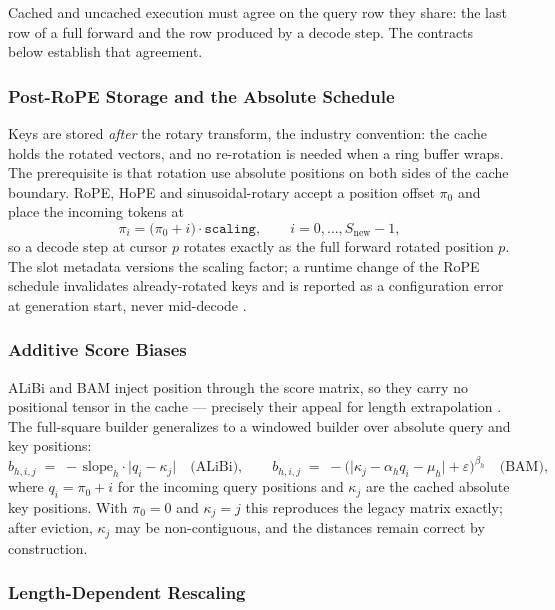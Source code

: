 Cached and uncached execution must agree on the query row they share: the last row of a full forward and the row produced by a decode step. The contracts below establish that agreement.

\subsubsection{Post-RoPE Storage and the Absolute Schedule}

Keys are stored \emph{after} the rotary transform, the industry convention: the cache holds the rotated vectors, and no re-rotation is needed when a ring buffer wraps. The prerequisite is that rotation use absolute positions on both sides of the cache boundary. RoPE, HoPE and sinusoidal-rotary accept a position offset $\pi_0$ and place the incoming tokens at
\[
\pi_i = \big(\pi_0 + i\big)\cdot \texttt{scaling}, \qquad i = 0,\dots,S_{\text{new}}-1 ,
\]
so a decode step at cursor $p$ rotates exactly as the full forward rotated position $p$. The slot metadata versions the scaling factor; a runtime change of the RoPE schedule invalidates already-rotated keys and is reported as a configuration error at generation start, never mid-decode \citep{su_rope_2024,dai_hope_2025}.

\subsubsection{Additive Score Biases}

ALiBi and BAM inject position through the score matrix, so they carry no positional tensor in the cache --- precisely their appeal for length extrapolation \citep{press_alibi_2022,bianchessi_bam_2025}. The full-square builder generalizes to a windowed builder over absolute query and key positions:
\[
b_{h,i,j} \;=\; -\,\text{slope}_h \cdot \big|q_i - \kappa_j\big| \quad\text{(ALiBi)},
\qquad
b_{h,i,j} \;=\; -\Big(\big|\kappa_j - \alpha_h q_i - \mu_h\big| + \varepsilon\Big)^{\beta_h} \quad\text{(BAM)},
\]
where $q_i = \pi_0 + i$ for the incoming query positions and $\kappa_j$ are the cached absolute key positions. With $\pi_0 = 0$ and $\kappa_j = j$ this reproduces the legacy matrix exactly; after eviction, $\kappa_j$ may be non-contiguous, and the distances remain correct by construction.

\subsubsection{Length-Dependent Rescaling}

